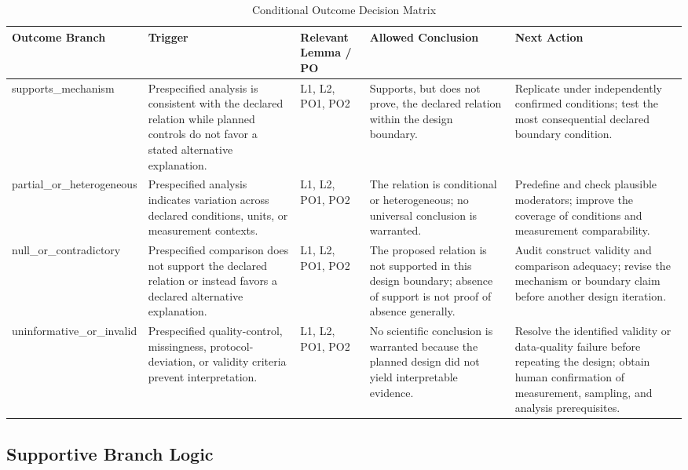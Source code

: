 \documentclass[conference]{IEEEtran}
\begin{document}
\begin{table}[htbp]
\centering
\footnotesize
\setlength{\tabcolsep}{3pt}
\renewcommand{\arraystretch}{1.12}
\caption{Conditional Outcome Decision Matrix}
\label{tab:expected-outcomes-eob-matrix}
\begin{tabular}{|p{}|p{}|p{}|p{}|p{}|}
\hline
Outcome Branch & Trigger & Relevant Lemma / PO & Allowed Conclusion & Next Action \\\hline
supports\_mechanism & Prespecified analysis is consistent with the declared relation while planned controls do not favor a stated alternative explanation. & L1, L2, PO1, PO2 & Supports, but does not prove, the declared relation within the design boundary. & Replicate under independently confirmed conditions; test the most consequential declared boundary condition. \\\hline
partial\_or\_heterogeneous & Prespecified analysis indicates variation across declared conditions, units, or measurement contexts. & L1, L2, PO1, PO2 & The relation is conditional or heterogeneous; no universal conclusion is warranted. & Predefine and check plausible moderators; improve the coverage of conditions and measurement comparability. \\\hline
null\_or\_contradictory & Prespecified comparison does not support the declared relation or instead favors a declared alternative explanation. & L1, L2, PO1, PO2 & The proposed relation is not supported in this design boundary; absence of support is not proof of absence generally. & Audit construct validity and comparison adequacy; revise the mechanism or boundary claim before another design iteration. \\\hline
uninformative\_or\_invalid & Prespecified quality-control, missingness, protocol-deviation, or validity criteria prevent interpretation. & L1, L2, PO1, PO2 & No scientific conclusion is warranted because the planned design did not yield interpretable evidence. & Resolve the identified validity or data-quality failure before repeating the design; obtain human confirmation of measurement, sampling, and analysis prerequisites. \\\hline
\end{tabular}
\end{table}

\subsection{Supportive Branch Logic}
\end{document}
